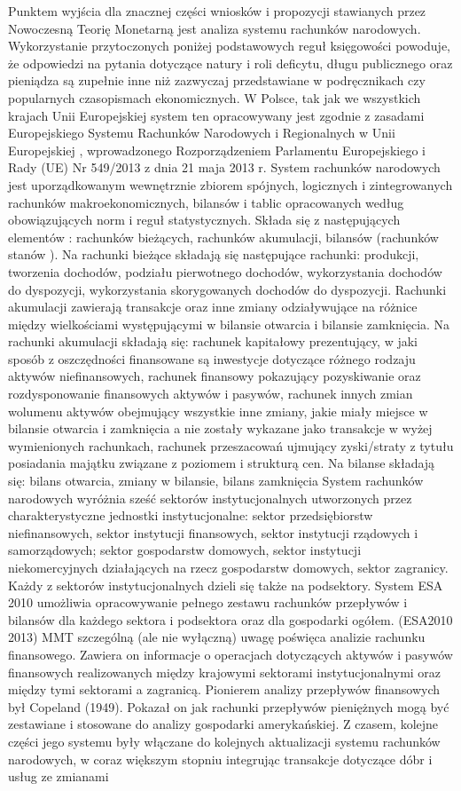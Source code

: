 \documentclass[
]{book}
\begin{document}
Punktem wyjścia dla znacznej części wniosków i propozycji stawianych przez Nowoczesną Teorię Monetarną jest analiza systemu rachunków narodowych. Wykorzystanie przytoczonych poniżej podstawowych reguł księgowości powoduje, że odpowiedzi na pytania dotyczące natury i roli deficytu, długu publicznego oraz pieniądza są zupełnie inne niż zazwyczaj przedstawiane w podręcznikach czy popularnych czasopismach ekonomicznych. W Polsce, tak jak we wszystkich krajach Unii Europejskiej system ten opracowywany jest zgodnie z zasadami Europejskiego Systemu Rachunków Narodowych i Regionalnych w Unii Europejskiej \citep{esa20102013}, wprowadzonego Rozporządzeniem Parlamentu Europejskiego i Rady (UE) Nr 549/2013 z dnia 21 maja 2013 r. System rachunków narodowych jest uporządkowanym wewnętrznie zbiorem spójnych, logicznych i zintegrowanych rachunków makroekonomicznych, bilansów i tablic opracowanych według obowiązujących norm i reguł statystycznych. Składa się z następujących elementów \citep{burdzicka2019}: rachunków bieżących, rachunków akumulacji, bilansów (rachunków stanów ). Na rachunki bieżące składają się następujące rachunki: produkcji, tworzenia dochodów, podziału pierwotnego dochodów, wykorzystania dochodów do dyspozycji, wykorzystania skorygowanych dochodów do dyspozycji. Rachunki akumulacji zawierają transakcje oraz inne zmiany odziaływujące na różnice między wielkościami występującymi w bilansie otwarcia i bilansie zamknięcia. Na rachunki akumulacji składają się: rachunek kapitałowy prezentujący, w jaki sposób z oszczędności finansowane są inwestycje dotyczące różnego rodzaju aktywów niefinansowych, rachunek finansowy pokazujący pozyskiwanie oraz rozdysponowanie finansowych aktywów i pasywów, rachunek innych zmian wolumenu aktywów obejmujący wszystkie inne zmiany, jakie miały miejsce w bilansie otwarcia i zamknięcia a nie zostały wykazane jako transakcje w wyżej wymienionych rachunkach, rachunek przeszacowań ujmujący zyski/straty z tytułu posiadania majątku związane z poziomem i strukturą cen. Na bilanse składają się: bilans otwarcia, zmiany w bilansie, bilans zamknięcia System rachunków narodowych wyróżnia sześć sektorów instytucjonalnych utworzonych przez charakterystyczne jednostki instytucjonalne: sektor przedsiębiorstw niefinansowych, sektor instytucji finansowych, sektor instytucji rządowych i samorządowych; sektor gospodarstw domowych, sektor instytucji niekomercyjnych działających na rzecz gospodarstw domowych, sektor zagranicy. Każdy z sektorów instytucjonalnych dzieli się także na podsektory. System ESA 2010 umożliwia opracowywanie pełnego zestawu rachunków przepływów i bilansów dla każdego sektora i podsektora oraz dla gospodarki ogółem. (ESA2010 2013) MMT szczególną (ale nie wyłączną) uwagę poświęca analizie rachunku finansowego. Zawiera on informacje o operacjach dotyczących aktywów i pasywów finansowych realizowanych między krajowymi sektorami instytucjonalnymi oraz między tymi sektorami a zagranicą. Pionierem analizy przepływów finansowych był Copeland (1949). Pokazał on jak rachunki przepływów pieniężnych mogą być zestawiane i stosowane do analizy gospodarki amerykańskiej. Z czasem, kolejne części jego systemu były włączane do kolejnych aktualizacji systemu rachunków narodowych, w coraz większym stopniu integrując transakcje dotyczące dóbr i usług ze zmianami 
\end{document}
